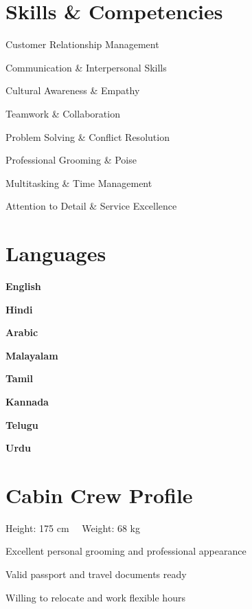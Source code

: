 \documentclass[a4paper,11pt]{article}
\begin{document}
		\section{Skills \& Competencies}
		\begin{itemize}[leftmargin=0.15in, label=\textbullet, itemsep=0pt]
			\small{
				\item Customer Relationship Management
				\item Communication \& Interpersonal Skills
				\item Cultural Awareness \& Empathy
				\item Teamwork \& Collaboration
				\item Problem Solving \& Conflict Resolution
				\item Professional Grooming \& Poise
				\item Multitasking \& Time Management
				\item Attention to Detail \& Service Excellence
			
			}
		\end{itemize}
		
		\section{Languages}
		\begin{itemize}[leftmargin=0.15in, label={}, itemsep=1pt]
			\small{
				\item \textbf{English}
				\item \textbf{Hindi}
				\item \textbf{Arabic}
				\item \textbf{Malayalam}
				\item \textbf{Tamil}
				\item \textbf{Kannada}
				\item \textbf{Telugu}
				\item \textbf{Urdu}
			}
		\end{itemize}
		
		\section{Cabin Crew Profile}
		\begin{itemize}[leftmargin=0.15in, label=\textbullet, itemsep=2pt]
			\small{
				\item Height: 175 cm \ \textbar\ Weight: 68 kg
				\item Excellent personal grooming and professional appearance
				\item Valid passport and travel documents ready
				\item Willing to relocate and work flexible hours
			}
		\end{itemize}
	
\end{document}

